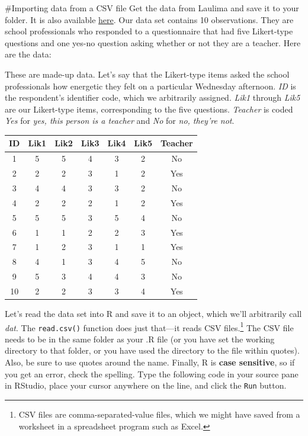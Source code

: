 \documentclass[]{tufte-handout}
\begin{document}
\#Importing data from a CSV file Get the data from Laulima and save it
to your folder. It is also available
\href{http://www2.hawaii.edu/~georgeha/Handouts/SchoolSurvey.csv}{here}.
Our data set contains 10 observations. They are school professionals who
responded to a questionnaire that had five Likert-type questions and one
yes-no question asking whether or not they are a teacher. Here are the
data:

\begin{marginfigure}
These are made-up data. Let's say that the Likert-type items asked the
school professionals how energetic they felt on a particular Wednesday
afternoon. \emph{ID} is the respondent's identifier code, which we
arbitrarily assigned. \emph{Lik1} through \emph{Lik5} are our
Likert-type items, corresponding to the five questions. \emph{Teacher}
is coded \emph{Yes} for \emph{yes, this person is a teacher} and
\emph{No} for \emph{no, they're not}.
\end{marginfigure}

\begin{longtable}[]{@{}ccccccc@{}}
\toprule
ID & Lik1 & Lik2 & Lik3 & Lik4 & Lik5 & Teacher\tabularnewline
\midrule
\endhead
1 & 5 & 5 & 4 & 3 & 2 & No\tabularnewline
2 & 2 & 2 & 3 & 1 & 2 & Yes\tabularnewline
3 & 4 & 4 & 3 & 3 & 2 & No\tabularnewline
4 & 2 & 2 & 2 & 1 & 2 & Yes\tabularnewline
5 & 5 & 5 & 3 & 5 & 4 & No\tabularnewline
6 & 1 & 1 & 2 & 2 & 3 & Yes\tabularnewline
7 & 1 & 2 & 3 & 1 & 1 & Yes\tabularnewline
8 & 4 & 1 & 3 & 4 & 5 & No\tabularnewline
9 & 5 & 3 & 4 & 4 & 3 & No\tabularnewline
10 & 2 & 2 & 3 & 3 & 4 & Yes\tabularnewline
\bottomrule
\end{longtable}

Let's read the data set into R and save it to an object, which we'll
arbitrarily call \emph{dat}. The \texttt{read.csv()} function does just
that---it reads CSV files.\footnote{CSV files are comma-separated-value
  files, which we might have saved from a worksheet in a spreadsheet
  program such as Excel.} The CSV file needs to be in the same folder as
your .R file (or you have set the working directory to that folder, or
you have used the directory to the file within quotes). Also, be sure to
use quotes around the name. Finally, R is \textbf{case sensitive}, so if
you get an error, check the spelling. Type the following code in your
source pane in RStudio, place your cursor anywhere on the line, and
click the \texttt{Run}
button.
\end{document}
